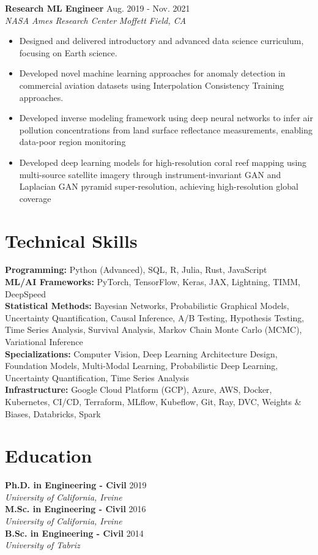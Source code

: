 \documentclass[11pt,a4paper]{article}
\newcommand{\entry}[4]{
    {\textbf{#1}} \hfill #2 \\
    {\textit{#3}} \hfill \textit{#4} \\
}
\begin{document}
\entry{Research ML Engineer}{Aug. 2019 - Nov. 2021}{NASA Ames Research Center}{Moffett Field, CA}
\begin{itemize}[nosep,leftmargin=*]
\item Designed and delivered introductory and advanced data science curriculum, focusing on Earth science.
\item Developed novel machine learning approaches for anomaly detection in commercial aviation datasets using Interpolation Consistency Training approaches.
\item Developed inverse modeling framework using deep neural networks to infer air pollution concentrations from land surface reflectance measurements, enabling data-poor region monitoring
\item Developed deep learning models for high-resolution coral reef mapping using multi-source satellite imagery through instrument-invariant GAN and Laplacian GAN pyramid super-resolution, achieving high-resolution global coverage
\end{itemize}

\section*{Technical Skills}
\textbf{Programming:} Python (Advanced), SQL, R, Julia, Rust, JavaScript\\
\textbf{ML/AI Frameworks:} PyTorch, TensorFlow, Keras, JAX, Lightning, TIMM, DeepSpeed\\
\textbf{Statistical Methods:} Bayesian Networks, Probabilistic Graphical Models, Uncertainty Quantification, Causal Inference, A/B Testing, Hypothesis Testing, Time Series Analysis, Survival Analysis, Markov Chain Monte Carlo (MCMC), Variational Inference\\
\textbf{Specializations:} Computer Vision, Deep Learning Architecture Design, Foundation Models, Multi-Modal Learning, Probabilistic Deep Learning, Uncertainty Quantification, Time Series Analysis\\
\textbf{Infrastructure:} Google Cloud Platform (GCP), Azure, AWS, Docker, Kubernetes, CI/CD, Terraform, MLflow, Kubeflow, Git, Ray, DVC, Weights \& Biases, Databricks, Spark

\section*{Education}
\entry{Ph.D. in Engineering - Civil}{2019}{University of California, Irvine}{}\entry{M.Sc. in Engineering - Civil}{2016}{University of California, Irvine}{}\entry{B.Sc. in Engineering - Civil}{2014}{University of Tabriz}{}
\end{document}
